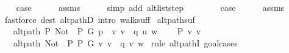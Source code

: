 \begin{isabellebody}
\ \ \isamarkupfalse%
\ {\isacharquery}{\kern0pt}case\isanewline
\ \ \ \ \isamarkupfalse%
\ assms{\isacharparenleft}{\kern0pt}{}{\isacharparenright}{\kern0pt}\isanewline
\ \ \ \ \isamarkupfalse%
\ {\isacharparenleft}{\kern0pt}simp\ add{\isacharcolon}{\kern0pt}\ alt{\isacharunderscore}{\kern0pt}list{\isacharunderscore}{\kern0pt}step{\isacharparenright}{\kern0pt}\isanewline
{}\isamarkupfalse%
\isanewline
\ \ \isamarkupfalse%
\ {}\isanewline
\ \ \isamarkupfalse%
\ {\isacharquery}{\kern0pt}case\isanewline
\ \ \ \ \isamarkupfalse%
\ assms{\isacharparenleft}{\kern0pt}{}{\isacharparenright}{\kern0pt}\isanewline
\ \ \ \ \isamarkupfalse%
\ {\isacharparenleft}{\kern0pt}fastforce\ dest{\isacharcolon}{\kern0pt}\ alt{\isacharunderscore}{\kern0pt}pathD{\isacharparenleft}{\kern0pt}{}{\isacharparenright}{\kern0pt}\ intro{\isacharcolon}{\kern0pt}\ walk{\isacharunderscore}{\kern0pt}suff{\isacharparenright}{\kern0pt}\isanewline
{}\isamarkupfalse%
%
\endisatagproof
{\isafoldproof}%
%
\isadelimproof
\isanewline
%
\endisadelimproof
\isanewline
{}\isamarkupfalse%
\ alt{\isacharunderscore}{\kern0pt}path{\isacharunderscore}{\kern0pt}suf{\isacharunderscore}{\kern0pt}{}{\isacharcolon}{\kern0pt}\isanewline
\ \ \ {\isachardoublequoteopen}alt{\isacharunderscore}{\kern0pt}path\ P\ {\isacharparenleft}{\kern0pt}Not\ {\isasymcirc}\ P{\isacharparenright}{\kern0pt}\ G\ {\isacharparenleft}{\kern0pt}p\ {\isacharat}{\kern0pt}\ {\isacharbrackleft}{\kern0pt}v{\isacharcomma}{\kern0pt}\ v{\isacharprime}{\kern0pt}{\isacharbrackright}{\kern0pt}\ {\isacharat}{\kern0pt}\ q{\isacharparenright}{\kern0pt}\ u\ w{\isachardoublequoteclose}\isanewline
\ \ \ {\isachardoublequoteopen}{\isasymnot}\ P\ {\isacharbraceleft}{\kern0pt}v{\isacharcomma}{\kern0pt}\ v{\isacharprime}{\kern0pt}{\isacharbraceright}{\kern0pt}{\isachardoublequoteclose}\isanewline
\ \ \ {\isachardoublequoteopen}alt{\isacharunderscore}{\kern0pt}path\ {\isacharparenleft}{\kern0pt}Not\ {\isasymcirc}\ P{\isacharparenright}{\kern0pt}\ P\ G\ {\isacharparenleft}{\kern0pt}{\isacharbrackleft}{\kern0pt}v{\isacharcomma}{\kern0pt}\ v{\isacharprime}{\kern0pt}{\isacharbrackright}{\kern0pt}\ {\isacharat}{\kern0pt}\ q{\isacharparenright}{\kern0pt}\ v\ w{\isachardoublequoteclose}\isanewline
%
\isadelimproof
%
\endisadelimproof
%
\isatagproof
{}\isamarkupfalse%
\ {\isacharparenleft}{\kern0pt}rule\ alt{\isacharunderscore}{\kern0pt}pathI{\isacharcomma}{\kern0pt}\ goal{\isacharunderscore}{\kern0pt}cases{\isacharparenright}{\kern0pt}\isanewline

\end{isabellebody}
